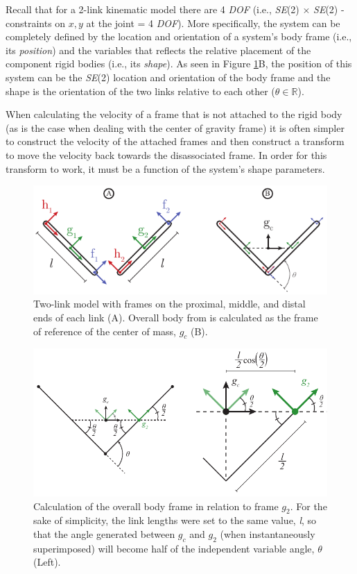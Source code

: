 \documentclass[a4paper]{article}
\begin{document}
 
Recall that for a 2-link kinematic model there are 4 \emph{DOF} (i.e., \emph{SE}(2) $\times$ \emph{SE}(2) - constraints on $x,y$ at the joint = 4 \emph{DOF}). More specifically, the system can be completely defined by the location and orientation of a system's body frame (i.e., its \emph{position}) and the variables that reflects the relative placement of the component rigid bodies (i.e., its \emph{shape}). As seen in Figure \ref{fig:kinematics}B, the position of this system can be the \emph{SE}(2) location and orientation of the body frame and the shape is the orientation of the two links relative to each other ($\theta \in \mathbb{R}$).

When calculating the velocity of a frame that is not attached to the rigid body (as is the case when dealing with the center of gravity frame) it is often simpler to construct the velocity of the attached frames and then construct a transform to move the velocity back towards the disassociated frame. In order for this transform to work, it must be a function of the system's shape parameters.  

\begin{figure}[H]
\centering
\includegraphics{Figure1}
\caption{Two-link model with frames on the proximal, middle, and distal ends of each link (A). Overall body from is calculated as the frame of reference of the center of mass, \emph{$g_{c}$} (B).}\label{fig:kinematics}
\end{figure}

\begin{figure}[H]
\centering
\includegraphics{Figure2}
\caption{Calculation of the overall body frame in relation to frame \emph{$g_2$}. For the sake of simplicity, the link lengths were set to the same value, \emph{l}, so that the angle generated between \emph{$g_{c}$} and \emph{$g_{2}$} (when instantaneously superimposed) will become half of the independent variable angle, $\theta$ (Left).}\label{fig:overallbodyframe}
\end{figure}
\end{document}
